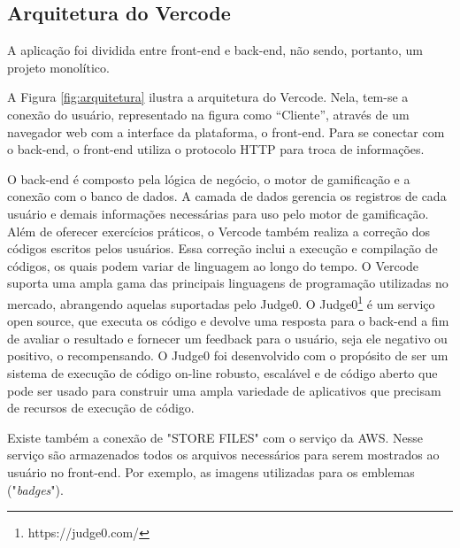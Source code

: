 \documentclass[12pt]{article}
\begin{document}
\subsection{Arquitetura do Vercode} \label{sec:arquitetura}

A aplicação foi dividida entre front-end e back-end, não sendo, portanto, um projeto monolítico. 

A Figura \ref{fig:arquitetura} ilustra a arquitetura do Vercode. Nela, tem-se a conexão do usuário, representado na figura como “Cliente”, através de um navegador web com a interface da plataforma, o front-end. Para se conectar com o back-end, o front-end utiliza o protocolo HTTP para troca de informações.

O back-end é composto pela lógica de negócio, o motor de gamificação e a conexão com o banco de dados. A camada de dados gerencia os registros de cada usuário e demais informações necessárias para uso pelo motor de gamificação. Além de oferecer exercícios práticos, o Vercode também realiza a correção dos códigos escritos pelos usuários. Essa correção inclui a execução e compilação de códigos, os quais podem variar de linguagem ao longo do tempo. O Vercode suporta uma ampla gama das principais linguagens de programação utilizadas no mercado, abrangendo aquelas suportadas pelo Judge0. O Judge0\footnote{https://judge0.com/} é um serviço open source, que executa os código e devolve uma resposta para o back-end a fim de avaliar o resultado e fornecer um feedback para o usuário, seja ele negativo ou positivo, o recompensando. O Judge0 foi desenvolvido com o propósito de ser um sistema de execução de código on-line robusto, escalável e de código aberto que pode ser usado para construir uma ampla variedade de aplicativos que precisam de recursos de execução de código.

Existe também a conexão de "STORE FILES" com o serviço da AWS. Nesse serviço são armazenados todos os arquivos necessários para serem mostrados ao usuário no front-end. Por exemplo, as imagens utilizadas para os emblemas ("\textit{badges}").   
   
\end{document}
